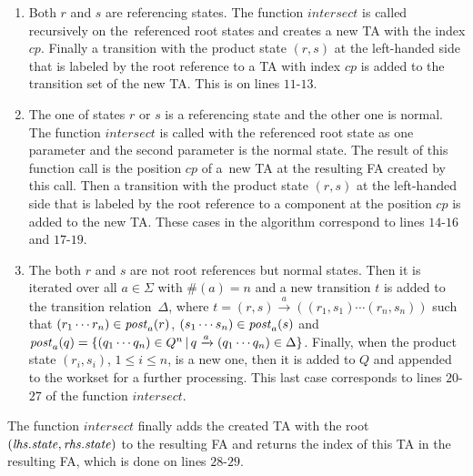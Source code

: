 \begin{enumerate}
	\item Both $r$ and $s$ are referencing states.
		The function $\mathit{intersect}$ is called recursively on the~referenced
		  root states and creates a new TA with the index $cp$.
		  Finally a transition with the product state $(r,s)$ at the left-handed side
		  that is labeled by the root reference to a TA with index $cp$ is added
		  to the transition set of the new TA.
		  This is on lines $11$-$13$.
	  \item The one of states $r$ or $s$ is a referencing state and the other one is normal.
			The function $\mathit{intersect}$ is called with the referenced root state as one parameter
			and the second parameter is the normal state.
    		The result of this function call is the position $cp$
			of a~new TA at the resulting FA created by this call.
    		Then a transition with the product state $(r,s)$ at the left-handed side
			that is labeled by the root reference to a component at the position $cp$
			is added to the new TA.
    		These cases in the algorithm correspond to lines $14$-$16$ and $17$-$19$.
	  \item The both $r$ and $s$ are not root references
			but normal states.
			Then it is iterated over all $a \in \Sigma$ with $\#(a) = n$
			and a new transition $t$ is added to the transition relation~$\Delta$,
			where $t = (r,s) \xrightarrow{a} ((r_1,s_1) \cdots (r_n, s_n))$ such that
			$(r_1 \cdots r_n) \in \mathit{post}_{a}(r)$, $(s_1 \cdots s_n) \in \mathit{post}_{a}(s)$ and
			$\mathit{post}_{a}(q) = \{(q_1 \cdots q_n) \in Q^n\,|\, q \xrightarrow{a} (q_1 \cdots q_n) \in \Delta\}$.
			Finally, when the product state $(r_i,s_i)$, $1 \leq i \leq n$, is a new one,
			then it is added to $Q$ and appended to the workset for a further processing.
			This last case corresponds to lines $20$-$27$ of the function $\mathit{intersect}$.
\end{enumerate}

The function $\mathit{intersect}$ finally adds the created TA with the root $(\mathit{lhs.state},\mathit{rhs.state})$
to the resulting FA and returns the index of this TA in the resulting FA, which is done on lines $28$-$29$.

